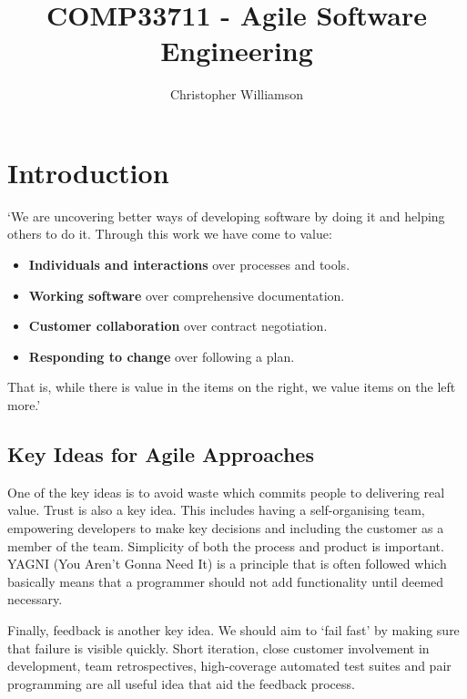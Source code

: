 \documentclass{article}
\begin{document}
\title{COMP33711 - Agile Software Engineering}
\author{Christopher Williamson}
\maketitle
\tableofcontents
\newpage
\section{Introduction}
`We are uncovering better ways of developing software by doing it and helping others to do it. Through this work we have come to value:
\begin{itemize}
	\item \textbf{Individuals and interactions} over processes and tools.
	\item \textbf{Working software} over comprehensive documentation.
	\item \textbf{Customer collaboration} over contract negotiation.
	\item \textbf{Responding to change} over following a plan.
\end{itemize}
That is, while there is value in the items on the right, we value items on the left more.'
\subsection{Key Ideas for Agile Approaches}
One of the key ideas is to avoid waste which commits people to delivering real value. Trust is also a key idea. This includes having a self-organising team, empowering developers to make key decisions and including the customer as a member of the team. Simplicity of both the process and product is important. YAGNI (You Aren't Gonna Need It) is a principle that is often followed which basically means that a programmer should not add functionality until deemed necessary.

Finally, feedback is another key idea. We should aim to `fail fast' by making sure that failure is visible quickly. Short iteration, close customer involvement in development, team retrospectives, high-coverage automated test suites and pair programming are all useful idea that aid the feedback process.
\end{document}

